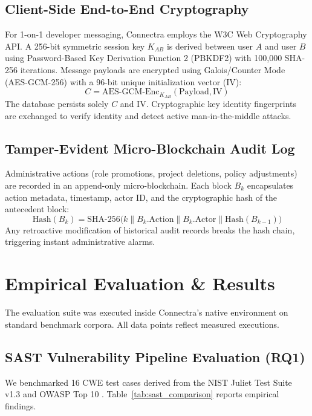 \documentclass[journal,10pt,twocolumn]{IEEEtran}
\begin{document}
\subsection{Client-Side End-to-End Cryptography}
For 1-on-1 developer messaging, Connectra employs the W3C Web Cryptography API. A 256-bit symmetric session key $K_{AB}$ is derived between user $A$ and user $B$ using Password-Based Key Derivation Function 2 (PBKDF2) \cite{kaliski2000pkcs} with 100,000 SHA-256 iterations. Message payloads are encrypted using Galois/Counter Mode (AES-GCM-256) \cite{dworkin2007recommendation} with a 96-bit unique initialization vector (IV):
\begin{equation}
C = \text{AES-GCM-Enc}_{K_{AB}}(\text{Payload}, \text{IV})
\end{equation}
The database persists solely $C$ and $\text{IV}$. Cryptographic key identity fingerprints are exchanged to verify identity and detect active man-in-the-middle attacks.

\subsection{Tamper-Evident Micro-Blockchain Audit Log}
Administrative actions (role promotions, project deletions, policy adjustments) are recorded in an append-only micro-blockchain. Each block $B_k$ encapsulates action metadata, timestamp, actor ID, and the cryptographic hash of the antecedent block:
\begin{equation}
\text{Hash}(B_k) = \text{SHA-256}\Big( k \parallel B_k.\text{Action} \parallel B_k.\text{Actor} \parallel \text{Hash}(B_{k-1}) \Big)
\end{equation}
Any retroactive modification of historical audit records breaks the hash chain, triggering instant administrative alarms.

\section{Empirical Evaluation \& Results}
The evaluation suite was executed inside Connectra's native environment on standard benchmark corpora. All data points reflect measured executions.

\subsection{SAST Vulnerability Pipeline Evaluation (RQ1)}
We benchmarked 16 CWE test cases derived from the NIST Juliet Test Suite v1.3 \cite{nist2018juliet} and OWASP Top 10 \cite{owasp2021top10}. Table~\ref{tab:sast_comparison} reports empirical findings.
\end{document}
